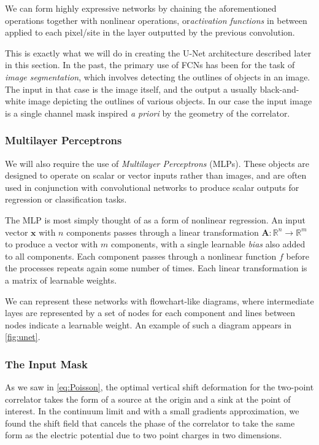\documentclass[12pt]{article}
\begin{document}
We can form highly expressive networks by chaining the aforementioned operations together with nonlinear operations, or\textit{activation functions} in between applied
to each pixel/site in the layer outputted by the previous convolution.

This is exactly what we will do in creating the U-Net architecture described later in this section. In the past, the primary use of FCNs has been for the task 
of \textit{image segmentation}, which involves detecting the outlines of objects in an image. The input in that case is the image itself, and the output
a usually black-and-white image depicting the outlines of various objects. In our case the input image is a single channel mask inspired \textit{a priori}
by the geometry of the correlator.

\subsubsection{Multilayer Perceptrons}

We will also require the use of \textit{Multilayer Perceptrons} (MLPs). These objects are designed to operate on scalar or vector inputs
rather than images, and are often used in conjunction with convolutional networks to produce scalar outputs for regression or classification tasks.

The MLP is most simply thought of as a form of nonlinear regression. An input vector $\mathbf{x}$ with $n$ components passes through a linear
transformation $\mathbf{A}:\mathbb{R}^n\to \mathbb{R}^m$ to produce a vector with $m$ components, with a single learnable \textit{bias} also added to all components. Each component passes through a nonlinear function $f$ 
before the processes repeats again some number of times. Each linear transformation is a matrix of learnable weights. 

We can represent these networks with flowchart-like diagrams, where intermediate layes are represented by a set of nodes for each component and lines between nodes
indicate a learnable weight. An example of such a diagram appears in \ref{fig:unet}.

\subsubsection{The Input Mask}

As we saw in \ref{eq:Poisson}, the optimal vertical shift deformation for the two-point correlator takes the form of a source at the origin and
a sink at the point of interest. In the continuum limit and with a small gradients approximation, we found the shift field that cancels the phase of
the correlator to take the same form as the electric potential due to two point charges in two dimensions. 
\end{document}
